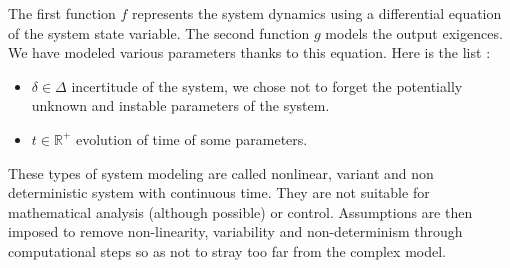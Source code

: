 The first function $f$ represents the system dynamics using a differential equation of the system state variable. The second function $g$ models the output exigences. We have modeled various parameters thanks to this equation. Here is the list : \begin{itemize}
\item $\delta \in \Delta$ incertitude of the system, we chose not to forget the potentially unknown and instable parameters of the system.
\item $t \in \mathbb{R}^{+}$ evolution of time of some parameters.
\end{itemize} 

These types of system modeling are called nonlinear, variant and non deterministic system with continuous time. They are not suitable for mathematical analysis (although possible) or control. Assumptions are then imposed to remove non-linearity, variability and non-determinism through computational steps so as not to stray too far from the complex model.

